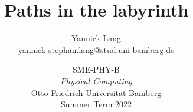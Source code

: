 \documentclass{article}
\title{Paths in the labyrinth}
\author{Yannick Lang\\
    \small yannick-stephan.lang@stud.uni-bamberg.de}
\date{ \vspace{0.5cm} \large 
  SME-PHY-B\\ 
  \emph{Physical Computing} \\ \vspace{0.2cm}
  Otto-Friedrich-Universität Bamberg \\ \vspace{0.2cm}
  Summer Term 2022}
\begin{document}
\newcommand{\IIC}{I\textsuperscript{2}C}

\maketitle













\printbibliography
\end{document}
